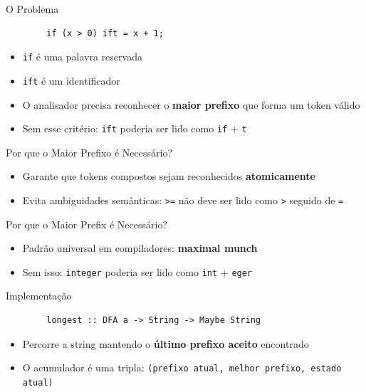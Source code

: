 \begin{frame}[fragile]{O Problema}

    \begin{lstlisting}
        if (x > 0) ift = x + 1;
    \end{lstlisting}

    \begin{itemize}

        \item
        \texttt{if} é uma palavra reservada
        \item
        \texttt{ift} é um identificador
        \item
        O analisador precisa reconhecer o \textbf{maior prefixo} que forma um
        token válido
        \item
        Sem esse critério: \texttt{ift} poderia ser lido como
        \texttt{if} + \texttt{t}
    \end{itemize}
\end{frame}

\begin{frame}[fragile]{Por que o Maior Prefixo é Necessário?}

    \begin{itemize}

        \item
        Garante que tokens compostos sejam reconhecidos \textbf{atomicamente}
        \item
        Evita ambiguidades semânticas: \texttt{>=} não deve
        ser lido como \texttt{>} seguido de
        \texttt{=}
    \end{itemize}
\end{frame}

\begin{frame}[fragile]{Por que o Maior Prefix é Necessário?}

    \begin{itemize}

        \item
        Padrão universal em compiladores: \textbf{maximal munch}
        \item
        Sem isso: \texttt{integer} poderia ser lido como
        \texttt{int} + \texttt{eger}
    \end{itemize}
\end{frame}

\begin{frame}[fragile]{Implementação}

    \begin{lstlisting}
        longest :: DFA a -> String -> Maybe String
    \end{lstlisting}

    \begin{itemize}

        \item
        Percorre a string mantendo o \textbf{último prefixo aceito} encontrado
        \item
        O acumulador é uma tripla:
        \texttt{(prefixo atual, melhor prefixo, estado atual)}
    \end{itemize}
\end{frame}

